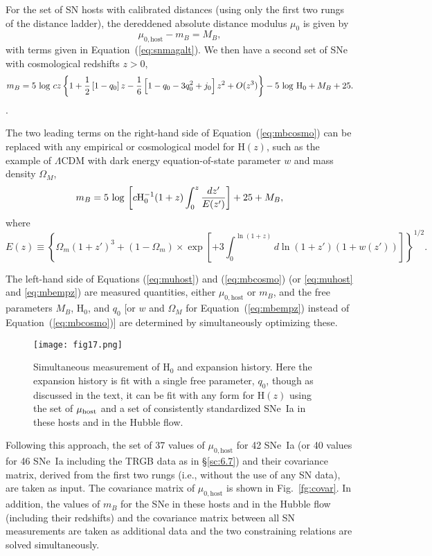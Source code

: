 \documentclass[12pt]{aastex631}
\newcommand{\bq}{\begin{equation}}
\newcommand{\eq}{\end{equation}}
\newcommand{\om}{\Omega_m}
\begin{document}
For the set of SN hosts with calibrated distances (using only the first two rungs of the distance ladder), the dereddened absolute distance modulus $\mu_0$ is given by 
\bq \mu_{0,\textrm{host}}-m_B=M_B , \label{eq:muhost} \eq 
with terms given in Equation~(\ref{eq:snmagalt}). We then have a second set of SNe with cosmological redshifts $z>0$, 
\bq m_B=5\,\log\,cz \left\{ 1 + {\frac{1}{2}}\left[1-q_0\right] {z} -{\frac{1}{6}}\left[1-q_0-3q_0^2+j_0 \right] z^2 + O(z^3) \right\} -5\,\log\,{\rm H}_0 + M_B + 25 .\label{eq:mbcosmo} \eq.

\noindent  
The two leading terms on the right-hand side of Equation~(\ref{eq:mbcosmo}) can be replaced with any empirical or cosmological model for H$(z)$, such as the example of $\Lambda$CDM with dark energy equation-of-state parameter $w$ and mass density $\Omega_M$,
\bq m_B=5\,\log\,\left [c{\rm H}_0^{-1}(1+z)  \int_0^z { \frac{dz'}{E(z')}} \right ] +25+M_B , \label{eq:mbempz}\eq
where \bq E(z) \equiv \left \{ \om(1+z')^3 +(1-\om) \times \exp \left [+3\int_0^{\ln(1+z)} d\ln(1+z') (1+w(z')) \right ] \right \}^{1/2}.\eq

The left-hand side of Equations (\ref{eq:muhost}) and (\ref{eq:mbcosmo}) (or \ref{eq:muhost} and \ref{eq:mbempz}) are measured quantities, either $\mu_{0,\textrm{host}}$ or $m_B$, and the free parameters $M_B$, H$_0$, and $q_0$ [or $w$ and $\Omega_M$ for Equation~(\ref{eq:mbempz}) instead of Equation~(\ref{eq:mbcosmo})] are determined by simultaneously optimizing these.
  
  
\begin{figure}[b]   
\begin{center}
\texttt{[image: fig17.png]}
\end{center}
\caption{\label{fg:h0exp} Simultaneous measurement of H$_0$ and expansion history.  Here the expansion history is fit with a single free parameter, $q_0$, though as discussed in the text, it can be fit with any form for H$(z)$ using the set of $\mu_{\rm host}$ and a set of consistently standardized SNe~Ia in these hosts and in the Hubble flow. }
\end{figure}

  
Following this approach, the set of 37 values of $\mu_{0,\textrm{host}}$ for 42 SNe~Ia (or 40 values for 46 SNe~Ia including the TRGB data as in \S\ref{sc:6.7}) and their covariance matrix, derived from the first two rungs (i.e., without the use of any SN data), are taken as input.  The covariance matrix of $\mu_{0,\textrm{host}}$ is shown in Fig.~\ref{fg:covar}.  In addition, the values of $m_B$ for the SNe in these hosts and in the Hubble flow (including their redshifts) and the covariance matrix between all SN measurements are taken as additional data and the two constraining relations are solved simultaneously.  
\end{document}
